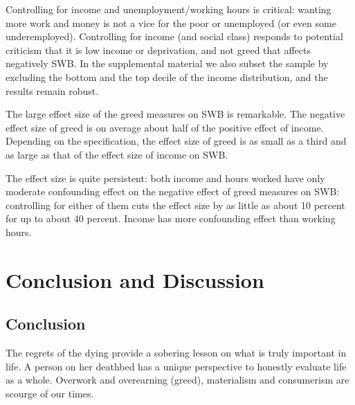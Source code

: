 \documentclass[10pt, letterpaper]{article}
\begin{document}
\begin{spacing}{1.8}
Controlling for income and unemployment/working hours is critical: wanting more work and money is not a vice for the poor or unemployed (or even some underemployed). 
Controlling for income (and social class) responds to potential criticism  that it is low
income or deprivation, and not greed that affects negatively SWB. In the supplemental material we also subset the sample by excluding the bottom and the top decile of the income distribution, and the results remain robust.  

The large effect size of the greed measures on SWB is remarkable. The negative effect size of greed is on average about half of the positive effect of income.
Depending on the specification, the effect size of greed is as small as a third and
as large as that of the effect size of income on SWB.

The effect size is quite persistent: both income and  hours worked have only moderate confounding effect on the negative effect of greed measures on SWB:
controlling for either of them cuts the effect size by as little as about 10 percent for up to about 40 percent. Income has more confounding effect than working hours. 

\section{Conclusion and Discussion}
\subsection{Conclusion}

The regrets of the dying \citep{ware12} provide a sobering lesson on what is
truly important in life. A person on her deathbed has a unique perspective to
honestly evaluate life as a whole. Overwork and overearning (greed), materialism and consumerism are scourge of our times.


\end{spacing}
\end{document}

